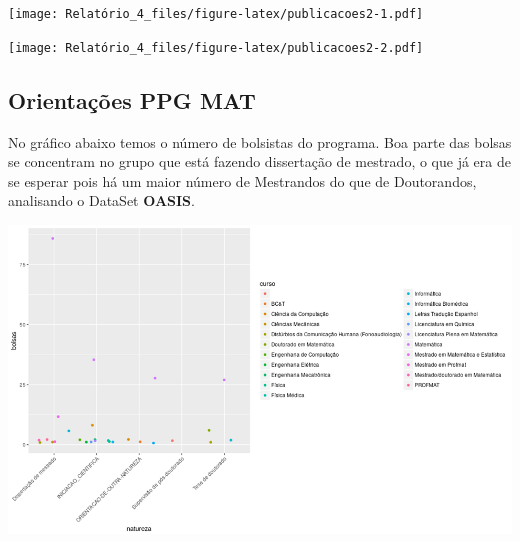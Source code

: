\documentclass[]{article}
\newenvironment{Shaded}{\begin{snugshade}}{\end{snugshade}}
\newcommand{\KeywordTok}[1]{\textcolor[rgb]{0.13,0.29,0.53}{\textbf{#1}}}
\newcommand{\DataTypeTok}[1]{\textcolor[rgb]{0.13,0.29,0.53}{#1}}
\newcommand{\DecValTok}[1]{\textcolor[rgb]{0.00,0.00,0.81}{#1}}
\newcommand{\StringTok}[1]{\textcolor[rgb]{0.31,0.60,0.02}{#1}}
\newcommand{\ControlFlowTok}[1]{\textcolor[rgb]{0.13,0.29,0.53}{\textbf{#1}}}
\newcommand{\OperatorTok}[1]{\textcolor[rgb]{0.81,0.36,0.00}{\textbf{#1}}}
\newcommand{\NormalTok}[1]{#1}
\begin{document}
\texttt{[image: Relatório\_4\_files/figure-latex/publicacoes2-1.pdf]}

\begin{Shaded}
\end{Shaded}

\texttt{[image: Relatório\_4\_files/figure-latex/publicacoes2-2.pdf]}

\begin{Shaded}
\end{Shaded}

\subsection{Orientações PPG MAT}\label{orientacoes-ppg-mat}

No gráfico abaixo temos o número de bolsistas do programa. Boa parte das
bolsas se concentram no grupo que está fazendo dissertação de mestrado,
o que já era de se esperar pois há um maior número de Mestrandos do que
de Doutorandos, analisando o DataSet \textbf{OASIS}.

\includegraphics{graph.png}
\end{document}
